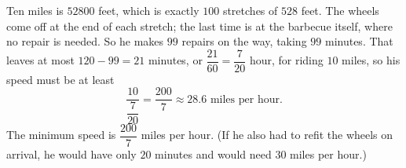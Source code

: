 Ten miles is $52800$ feet, which is exactly $100$ stretches of $528$ feet. The wheels come off at the end of each stretch; the last time is at the barbecue itself, where no repair is needed. So he makes $99$ repairs on the way, taking $99$ minutes. That leaves at most $120-99=21$ minutes, or $\dfrac{21}{60}=\dfrac{7}{20}$ hour, for riding $10$ miles, so his speed must be at least
\[\dfrac{10}{\dfrac{7}{20}}=\dfrac{200}{7}\approx28.6\text{ miles per hour}.\]
The minimum speed is $\boxed{\dfrac{200}{7}}$ miles per hour. (If he also had to refit the wheels on arrival, he would have only $20$ minutes and would need $30$ miles per hour.)
